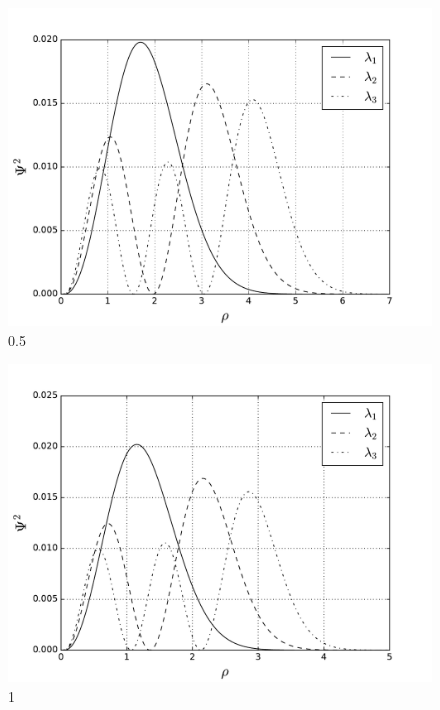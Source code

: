 \documentclass[10pt]{article}
\begin{document}
\begin{figure}
  \begin{center}
    \includegraphics[scale=0.7]{two_05}
    \caption{0.5}
    \label{fig:omega_0.5}
  \end{center}
\end{figure}
\newpage

\begin{figure}
  \begin{center}
    \includegraphics[scale=0.7]{two_1}
    \caption{1}
    \label{fig:omega_1}
  \end{center}
\end{figure}
\newpage
\end{document}

